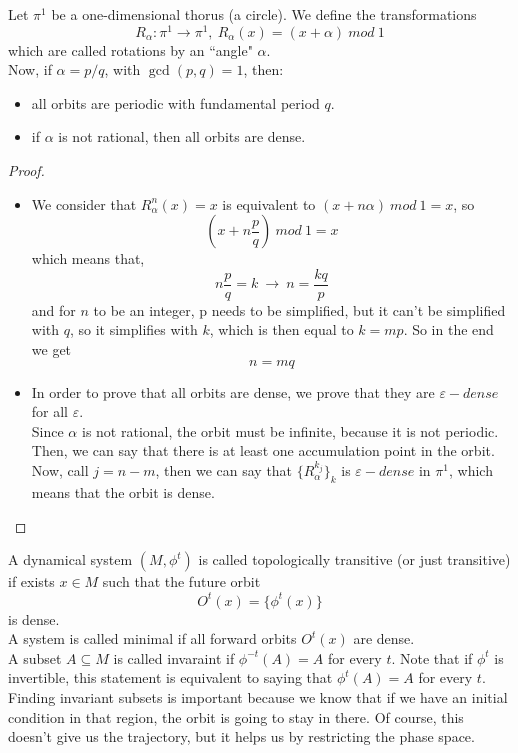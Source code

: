 Let $\pi^1$ be a one-dimensional thorus (a circle). We define the transformations 
$$
R_\alpha : \pi^1 \rightarrow \pi^1, \ R_\alpha(x) = (x + \alpha) \ mod \ 1
$$
which are called rotations by an ``angle" $\alpha$. \\
Now, if $\alpha = p/q$, with $\gcd(p,q)=1$, then:
\begin{itemize}
	\item all orbits are periodic with fundamental period $q$. 
	\item if $\alpha$ is not rational, then all orbits are dense. 
\end{itemize}
\begin{proof}
	\begin{itemize}
		\item We consider that $R^n_\alpha(x)=x$ is equivalent to $(x + n\alpha) \ mod \ 1 = x$, so 
		$$ 
			\left(x + n\frac{p}{q}\right) \ mod \ 1 = x
		$$
		which means that, 
		$$
			n\frac{p}{q} = k \ \longrightarrow	\ n = \frac{kq}{p}
		$$
		and for $n$ to be an integer, p needs to be simplified, but it can't be simplified with $q$, so it simplifies with $k$, which is then equal to $k = mp$. So in the end we get
		$$
			n = mq
		$$
		\item In order to prove that all orbits are dense, we prove that they are $\varepsilon-dense$ for all $\varepsilon$. \\
		Since $\alpha$ is not rational, the orbit must be infinite, because it is not periodic. Then, we can say that there is at least one accumulation point in the orbit. \\
		Now, call $j = n - m$, then we can say that $\{R^{k_j}_\alpha\}_k$ is $\varepsilon-dense$ in $\pi^1$, which means that the orbit is dense.
	\end{itemize}
\end{proof}
A dynamical system $(M,\phi^t)$ is called topologically transitive (or just transitive) if exists $x\in M$ such that the future orbit
$$
	O^t(x) = \{\phi^t(x)\}
$$
is dense. \\
A system is called minimal if all forward orbits $O^t(x)$ are dense. \\ 
A subset $A \subseteq M$ is called invaraint if $\phi^{-t}(A) = A$ for every $t$. Note that if $\phi^t$ is invertible, this statement is equivalent to saying that $\phi^t(A) = A$ for every $t$. \\
Finding invariant subsets is important because we know that if we have an initial condition in that region, the orbit is going to stay in there. Of course, this doesn't give us the trajectory, but it helps us by restricting the phase space. \\
